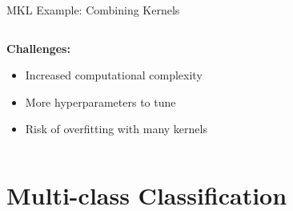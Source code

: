 \documentclass[8pt,aspectratio=1610]{beamer}
\begin{document}
\begin{frame}{MKL Example: Combining Kernels}
\begin{columns}[t]
\begin{column}{0.48\textwidth}
\vspace{0.3cm}
\textbf{Challenges:}
\begin{itemize}
\setlength{\itemsep}{1pt}
\item Increased computational complexity
\item More hyperparameters to tune
\item Risk of overfitting with many kernels
\end{itemize}
\end{column}
\end{columns}
\end{frame}

\section{Multi-class Classification}
\end{document}

